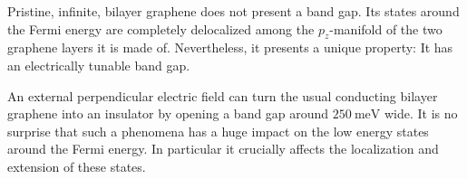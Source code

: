 %


Pristine, infinite, bilayer graphene does not present a band gap. Its states around the Fermi energy are completely delocalized among the $p_z$-manifold of the two graphene layers it is made of. Nevertheless, it presents a unique property: It has an electrically tunable band gap.

An external perpendicular electric field can turn the usual conducting bilayer graphene into an insulator by opening a band gap around $\SI{250}{\meV}$ wide\cite{McCann2006, Castro2007, Oostinga2007, Zhang2009, Taychatanapat2010, Castro2010a, Ponomarenko2011, Allen2012, Sui2015}.
It is no surprise that such a phenomena has a huge impact on the low energy states around the Fermi energy. In particular it crucially affects the localization and extension of these states.

